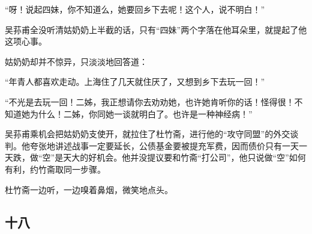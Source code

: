 \par “呀！说起四妹，你不知道么，她要回乡下去呢！这个人，说不明白！”
\par 吴荪甫全没听清姑奶奶上半截的话，只有“四妹”两个字落在他耳朵里，就提起了他这项心事。
\par 姑奶奶却并不惊异，只淡淡地回答道：
\par “年青人都喜欢走动。上海住了几天就住厌了，又想到乡下去玩一回！”
\par “不光是去玩一回！二姊，我正想请你去劝劝她，也许她肯听你的话！怪得很！不知道她为什么！二姊，你同她一谈就明白了。也许是一种神经病！”
\par 吴荪甫乘机会把姑奶奶支使开，就拉住了杜竹斋，进行他的“攻守同盟”的外交谈判。他夸张地讲述战事一定要延长，公债基金要被提充军费，因而债价只有一天一天跌，做“空”是天大的好机会。他并没提议要和竹斋“打公司”，他只说做“空”如何有利，约竹斋取同一步骤。
\par 杜竹斋一边听，一边嗅着鼻烟，微笑地点头。




\subsection*{十八}

